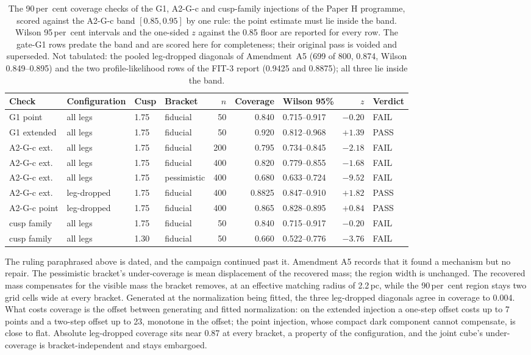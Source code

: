\documentclass[11pt]{article}
\begin{document}
\begin{table}[tbp]
\centering
\small
\caption{The 90\,per~cent coverage checks of the G1, A2-G-c and cusp-family injections of the Paper H programme, scored against the A2-G-c band $[0.85, 0.95]$ by one rule: the point estimate must lie inside the band. Wilson 95\,per~cent intervals and the one-sided $z$ against the 0.85 floor are reported for every row. The gate-G1 rows predate the band and are scored here for completeness; their original pass is voided and superseded. Not tabulated: the pooled leg-dropped diagonals of Amendment~A5 (699 of 800, 0.874, Wilson 0.849--0.895) and the two profile-likelihood rows of the FIT-3 report (0.9425 and 0.8875); all three lie inside the band.}
\label{tab:calib}
\begin{tabular}{llllrrlrl}
\hline
Check & Configuration & Cusp & Bracket & $n$ & Coverage & Wilson 95\% & $z$ & Verdict \\
\hline
G1 point & all legs & 1.75 & fiducial & 50 & 0.840 & 0.715--0.917 & $-0.20$ & FAIL \\
G1 extended & all legs & 1.75 & fiducial & 50 & 0.920 & 0.812--0.968 & $+1.39$ & PASS \\
A2-G-c ext. & all legs & 1.75 & fiducial & 200 & 0.795 & 0.734--0.845 & $-2.18$ & FAIL \\
A2-G-c ext. & all legs & 1.75 & fiducial & 400 & 0.820 & 0.779--0.855 & $-1.68$ & FAIL \\
A2-G-c ext. & all legs & 1.75 & pessimistic & 400 & 0.680 & 0.633--0.724 & $-9.52$ & FAIL \\
A2-G-c ext. & leg-dropped & 1.75 & fiducial & 400 & 0.8825 & 0.847--0.910 & $+1.82$ & PASS \\
A2-G-c point & leg-dropped & 1.75 & fiducial & 400 & 0.865 & 0.828--0.895 & $+0.84$ & PASS \\
cusp family & all legs & 1.75 & fiducial & 50 & 0.840 & 0.715--0.917 & $-0.20$ & FAIL \\
cusp family & all legs & 1.30 & fiducial & 50 & 0.660 & 0.522--0.776 & $-3.76$ & FAIL \\
\hline
\end{tabular}
\end{table}

The ruling paraphrased above is dated, and the campaign continued past it. Amendment A5 records that it found
a mechanism but no repair. The pessimistic bracket's under-coverage is mean displacement
of the recovered mass; the region width is unchanged. The recovered mass compensates for the visible mass the bracket removes, at an
effective matching radius of 2.2\,pc, while the 90\,per~cent region stays two grid cells wide at
every bracket. Generated at the normalization being fitted, the three leg-dropped diagonals agree
in coverage to 0.004. What costs coverage is the offset between generating and fitted
normalization: on the extended injection a one-step offset costs up to 7 points and a two-step offset up to 23, monotone in the offset; the point injection, whose compact dark component cannot compensate, is close to flat. Absolute leg-dropped coverage sits
near 0.87 at every bracket, a property of the configuration, and the joint cube's under-coverage is
bracket-independent and stays embargoed.
\end{document}
